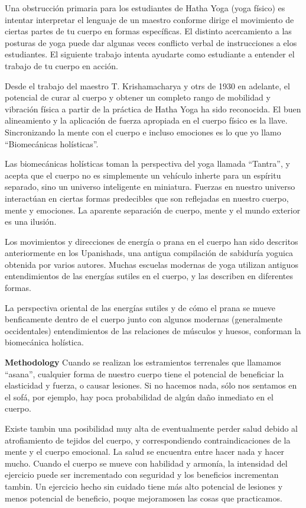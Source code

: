 Una obstrucción primaria para los estudiantes de Hatha Yoga (yoga físico) es intentar interpretar el lenguaje de un maestro conforme dirige el movimiento de ciertas partes de tu cuerpo en formas específicas. El distinto acercamiento a las posturas de yoga puede dar algunas veces conflicto verbal de instrucciones a elos estudiantes. El siguiente trabajo intenta ayudarte como estudiante a entender el trabajo de tu cuerpo en acción.

Desde el trabajo del maestro T. Krishamacharya y otrs de 1930 en adelante, el potencial de curar al cuerpo y obtener un completo rango de mobilidad y vibración física a partir de la práctica de Hatha Yoga ha sido reconocida. El buen alineamiento y la aplicación de fuerza apropiada en el cuerpo físico es la llave. Sincronizando la mente con el cuerpo e incluso emociones es lo que yo llamo ``Biomecánicas holísticas''.

Las biomecánicas holísticas toman la perspectiva del yoga llamada ``Tantra'', y acepta que el cuerpo no es simplemente un vehículo inherte para un espíritu separado, sino un universo inteligente en miniatura. Fuerzas en nuestro universo interactúan en ciertas formas predecibles que son reflejadas en nuestro cuerpo, mente y emociones. La aparente separación de cuerpo, mente y el mundo exterior es una ilusión.

Los movimientos y direcciones de energía o prana en el cuerpo han sido descritos anteriormente en los Upanishads, una antigua compilación de sabiduría yoguica obtenida por varios autores. Muchas escuelas modernas de yoga utilizan antiguos entendimientos de las energías sutiles en el cuerpo, y las describen en diferentes formas.

La perspectiva oriental de las energías sutiles y de cómo el prana se mueve benficamente dentro de el cuerpo junto con algunos modernas (generalmente occidentales) entendimientos de las relaciones de músculos y huesos, conforman la biomecánica holística.

\textbf{Methodology}
Cuando se realizan los estramientos terrenales que llamamos ``asana'', cualquier forma de nuestro cuerpo tiene el potencial de beneficiar la elasticidad y fuerza, o causar lesiones. Si no hacemos nada, sólo nos sentamos en el sofá, por ejemplo, hay poca probabilidad de algún daño inmediato en el cuerpo.

Existe tambin una posibilidad muy alta de eventualmente perder salud debido al atrofiamiento de tejidos del cuerpo, y correspondiendo contraindicaciones de la mente y el cuerpo emocional. La salud se encuentra entre hacer nada y hacer mucho. Cuando el cuerpo se mueve con habilidad y armonía, la intensidad del ejercicio puede ser incrementado con seguridad y los beneficios incrementan tambin. Un ejercicio hecho sin cuidado tiene más alto potencial de lesiones y menos potencial de beneficio, poque mejoramosen las cosas que practicamos.

